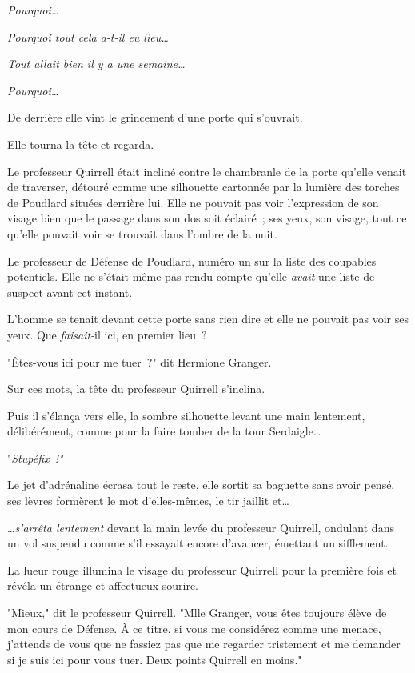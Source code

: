 \emph{Pourquoi…}

\emph{Pourquoi tout cela a-t-il eu lieu…}

\emph{Tout allait bien il y a une semaine…}

\emph{Pourquoi…}

De derrière elle vint le grincement d'une porte qui s'ouvrait.

Elle tourna la tête et regarda.

Le professeur Quirrell était incliné contre le chambranle de la porte qu'elle venait de traverser, détouré comme une silhouette cartonnée par la lumière des torches de Poudlard situées derrière lui. Elle ne pouvait pas voir l'expression de son visage bien que le passage dans son dos soit éclairé~; ses yeux, son visage, tout ce qu'elle pouvait voir se trouvait dans l'ombre de la nuit.

Le professeur de Défense de Poudlard, numéro un sur la liste des coupables potentiels. Elle ne s'était même pas rendu compte qu'elle \emph{avait} une liste de suspect avant cet instant.

L'homme se tenait devant cette porte sans rien dire et elle ne pouvait pas voir ses yeux. Que \emph{faisait-}il ici, en premier lieu~?

"Êtes-vous ici pour me tuer~?" dit Hermione Granger.

Sur ces mots, la tête du professeur Quirrell s'inclina.

Puis il s'élança vers elle, la sombre silhouette levant une main lentement, délibérément, comme pour la faire tomber de la tour Serdaigle…

"\emph{Stupéfix~!"}

Le jet d'adrénaline écrasa tout le reste, elle sortit sa baguette sans avoir pensé, ses lèvres formèrent le mot d'elles-mêmes, le tir jaillit et…

…\emph{s'arrêta lentement} devant la main levée du professeur Quirrell, ondulant dans un vol suspendu comme s'il essayait encore d'avancer, émettant un sifflement.

La lueur rouge illumina le visage du professeur Quirrell pour la première fois et révéla un étrange et affectueux sourire.

"Mieux," dit le professeur Quirrell. "Mlle Granger, vous êtes toujours élève de mon cours de Défense. À ce titre, si vous me considérez comme une menace, j'attends de vous que ne fassiez pas que me regarder tristement et me demander si je suis ici pour vous tuer. Deux points Quirrell en moins."

